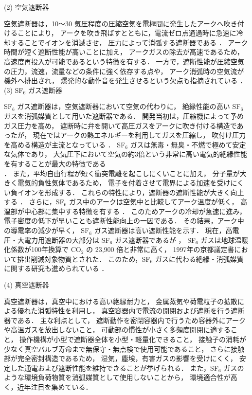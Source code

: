 \documentclass[dvipdfmx,report,uplatex]{jsbook}
\numberwithin{equation}{section}
\numberwithin{figure}{section}
\numberwithin{table}{section}
\begin{document}
(2) 空気遮断器  

空気遮断器は，10～30 気圧程度の圧縮空気を電極間に発生したアークへ吹き付けることにより，
アークを吹き飛ばすとともに，電流ゼロ点通過時に急速に冷却することでイオンを消滅させ，
圧力によって消弧する遮断器である \cite{IEEJ_CB_1975}．
アーク時間が短く遮断性能が高いことに加え，
アークガスの除去が高速であるため，高速度再投入が可能であるという特徴を有する．
一方で，遮断性能が圧縮空気の圧力，流速，流量などの条件に強く依存する点や，
アーク消弧時の空気流が機外へ排出され，
爆発的な動作音を発生させるという欠点も指摘されている \cite{BN05571456}．\\

(3) SF$_6$ ガス遮断器  

SF$_6$ ガス遮断器は，空気遮断器において空気の代わりに，
絶縁性能の高い SF$_6$ ガスを消弧媒質として用いた遮断器である．
開発当初は，圧縮機によって予めガス圧力を高め，
遮断時に弁を開いて高圧ガスをアークに吹き付ける構造であったが，
現在ではアークの熱エネルギーを利用してガスを圧縮し，
吹付け圧力を高める構造が主流となっている
\cite{Yanabu2000,吉岡芳夫2006電力用遮断器の現状と将来}．
SF$_6$ ガスは無毒・無臭・不燃で極めて安定な気体であり，
大気圧下において空気の約3倍という非常に高い電気的絶縁性能を有することが最大の特徴である\\
\cite{bo2017investigation}．
また，平均自由行程が短く衝突電離を起こしにくいことに加え，
分子量が大きく電気的負性気体であるため，
電子を付着させて電界による加速を受けにくい負イオンを形成する．
これらの特性により，遮断器の遮断性能が大きく向上する
\cite{IEEJ_CB_1975,Hidaka2009}．
さらに，SF$_6$ ガス中のアークは空気中と比較してアーク温度が低く，
高温部が中心部に集中する特徴を有する
\cite{IEEJ_CB_1975,Yanabu2000,Hidaka2009}．
このためアークの冷却が急速に進み，
電子密度の低下が早いことも遮断性能向上の一因である．
その結果，アーク中の導電率の減少が早く，
SF$_6$ ガス遮断器は高い遮断性能を示す．
現在，高電圧・大電力用遮断器の大部分は SF$_6$ ガス遮断器であるが
\cite{吉岡芳夫2006電力用遮断器の現状と将来}，
SF$_6$ ガスは地球温暖化係数が100年換算で CO$_2$ の 23,900 倍と非常に高く，
1997年の京都議定書において排出削減対象物質とされた．
このため，SF$_6$ ガスに代わる絶縁・消弧媒質に関する研究も進められている
\cite{斉藤仁2009真空遮断器の最近の動向,大久保仁2003環境低負荷の真空遮断器}．

(4) 真空遮断器 \cite{IEEJ_CB_1975}  

真空遮断器は，真空中における高い絶縁耐力と，
金属蒸気や荷電粒子の拡散による優れた消弧特性を利用し，
真空容器内で電流の開閉および遮断を行う遮断器である．
主な利点として，
遮断動作を密閉容器内で行うため容器外にアークや高温ガスを放出しないこと，
可動部の慣性が小さく多頻度開閉に適すること，
操作機構が小型で遮断器全体を小型・軽量化できること，
接触子の消耗が少なく真空バルブ寿命まで無保守・無点検で使用可能であること，
さらに接触部が完全密封構造であるため，
湿気，塵埃，有害ガスの影響を受けにくく，
安定した通電および遮断性能を維持できることが挙げられる．
また，SF$_6$ ガスのような環境負荷物質を消弧媒質として使用しないことから，
環境適合性が高く，近年注目を集めている．
\end{document}
